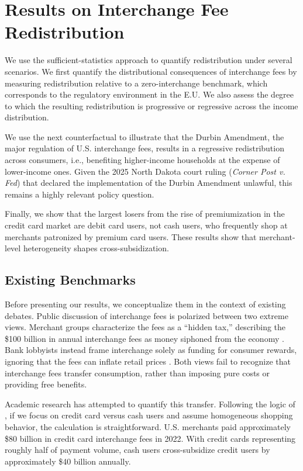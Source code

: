 \documentclass[main.tex]{subfiles}
\begin{document}
\section{Results on Interchange Fee Redistribution}
\label{sec:Results}
We use the sufficient-statistics approach to quantify redistribution under several scenarios.
We first quantify the distributional consequences of interchange fees by measuring redistribution relative to a zero-interchange benchmark, which corresponds to the regulatory environment in the E.U.
We also assess the degree to which the resulting redistribution is progressive or regressive across the income distribution.

We use the next counterfactual to illustrate that the Durbin Amendment, the major regulation of U.S. interchange fees, results in a regressive redistribution across consumers, i.e., benefiting higher-income households at the expense of lower-income ones.
Given the 2025 North Dakota court ruling (\textit{Corner Post v. Fed}) that declared the implementation of the Durbin Amendment unlawful, this remains a highly relevant policy question.

Finally, we show that the largest losers from the rise of premiumization in the credit card market are debit card users, not cash users, who frequently shop at merchants patronized by premium card users.
These results show that merchant-level heterogeneity shapes cross-subsidization.

\subsection{Existing Benchmarks}

Before presenting our results, we conceptualize them in the context of existing debates.
Public discussion of interchange fees is polarized between two extreme views. 
Merchant groups characterize the fees as a ``hidden tax,'' describing the \$100 billion in annual interchange fees as money siphoned from the economy \citep{MerchantPaymentsCoalition2024}. 
Bank lobbyists instead frame interchange solely as funding for consumer rewards, ignoring that the fees can inflate retail prices \citep{BPI2024}. 
Both views fail to recognize that interchange fees transfer consumption, rather than imposing pure costs or providing free benefits.

Academic research has attempted to quantify this transfer. Following the logic of \citet{schuh2010gains}, if we focus on credit card versus cash users and assume homogeneous shopping behavior, the calculation is straightforward. U.S. merchants paid approximately \$80 billion in credit card interchange fees in 2022. With credit cards representing roughly half of payment volume, cash users cross-subsidize credit users by approximately \$40 billion annually.
\end{document}
